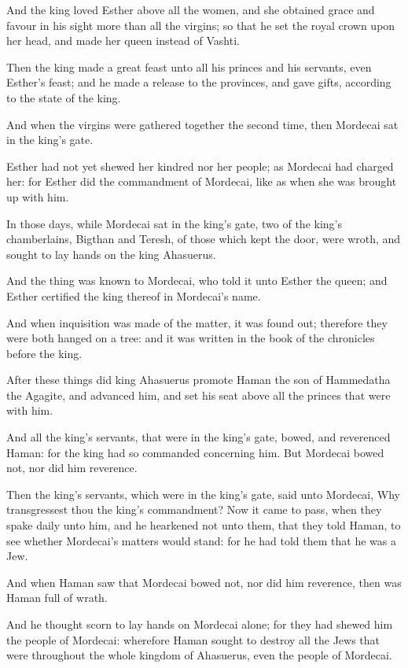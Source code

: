 \Verse And the king loved Esther above all the women, and she obtained grace and favour in his sight more than all the virgins; so that he set the royal crown upon her head, and made her queen instead of Vashti.

\Verse Then the king made a great feast unto all his princes and his servants, even Esther's feast; and he made a release to the provinces, and gave gifts, according to the state of the king.

\Verse And when the virgins were gathered together the second time, then Mordecai sat in the king's gate.

\Verse Esther had not yet shewed her kindred nor her people; as Mordecai had charged her: for Esther did the commandment of Mordecai, like as when she was brought up with him.

\Verse In those days, while Mordecai sat in the king's gate, two of the king's chamberlains, Bigthan and Teresh, of those which kept the door, were wroth, and sought to lay hands on the king Ahasuerus.

\Verse And the thing was known to Mordecai, who told it unto Esther the queen; and Esther certified the king thereof in Mordecai's name.

\Verse And when inquisition was made of the matter, it was found out; therefore they were both hanged on a tree: and it was written in the book of the chronicles before the king.


\Chapter
\Verse After these things did king Ahasuerus promote Haman the son of Hammedatha the Agagite, and advanced him, and set his seat above all the princes that were with him.

\Verse And all the king's servants, that were in the king's gate, bowed, and reverenced Haman: for the king had so commanded concerning him.  But Mordecai bowed not, nor did him reverence.

\Verse Then the king's servants, which were in the king's gate, said unto Mordecai, Why transgressest thou the king's commandment?  \Verse Now it came to pass, when they spake daily unto him, and he hearkened not unto them, that they told Haman, to see whether Mordecai's matters would stand: for he had told them that he was a Jew.

\Verse And when Haman saw that Mordecai bowed not, nor did him reverence, then was Haman full of wrath.

\Verse And he thought scorn to lay hands on Mordecai alone; for they had shewed him the people of Mordecai: wherefore Haman sought to destroy all the Jews that were throughout the whole kingdom of Ahasuerus, even the people of Mordecai.

